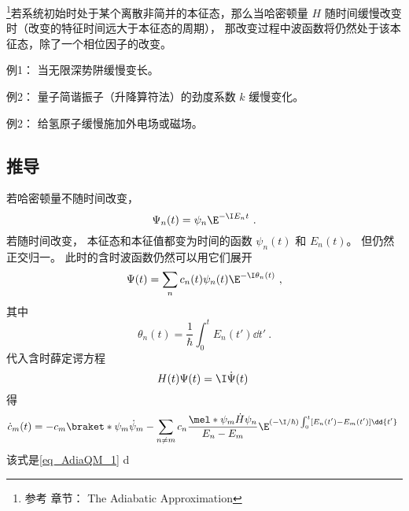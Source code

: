 

\begin{issues}
\issueDraft
\end{issues}

\footnote{参考 \cite{GriffE} 章节： The Adiabatic Approximation}若系统初始时处于某个离散非简并的本征态，那么当哈密顿量 $H$ 随时间缓慢改变时（改变的特征时间远大于本征态的周期）， 那改变过程中波函数将仍然处于该本征态，除了一个相位因子的改变。

例1： 当无限深势阱缓慢变长。

例2： 量子简谐振子（升降算符法）的劲度系数 $k$ 缓慢变化。

例2： 给氢原子缓慢施加外电场或磁场。

\subsection{推导}
若哈密顿量不随时间改变，
\begin{equation}
\Psi_n(t) = \psi_n \E^{-\I E_n t}~.
\end{equation}
若随时间改变， 本征态和本征值都变为时间的函数 $\psi_n(t)$ 和 $E_n(t)$。 但仍然正交归一。 此时的含时波函数仍然可以用它们展开
\begin{equation}
\Psi(t) = \sum_n c_n(t) \psi_n(t) \E^{-\I \theta_n(t)}~,
\end{equation}
其中
\begin{equation}
\theta_n(t) = \frac{1}{\hbar} \int_0^t E_n(t')\dd{t'}~.
\end{equation}
代入含时薛定谔方程
\begin{equation}\label{eq_AdiaQM_1}
H(t)\Psi(t) = \I \dot \Psi(t)~
\end{equation}
得
\begin{equation}
\dot c_m(t) = -c_m \braket*{\psi_m}{\dot\psi_m} - \sum_{n\ne m} c_n \frac{\mel*{\psi_m}{\dot H}{\psi_n}}{E_n-E_m} \E^{(-\I/\hbar) \int_0^t[E_n(t')-E_m(t')]\dd{t'}}~
\end{equation}
该式是\autoref{eq_AdiaQM_1} d
